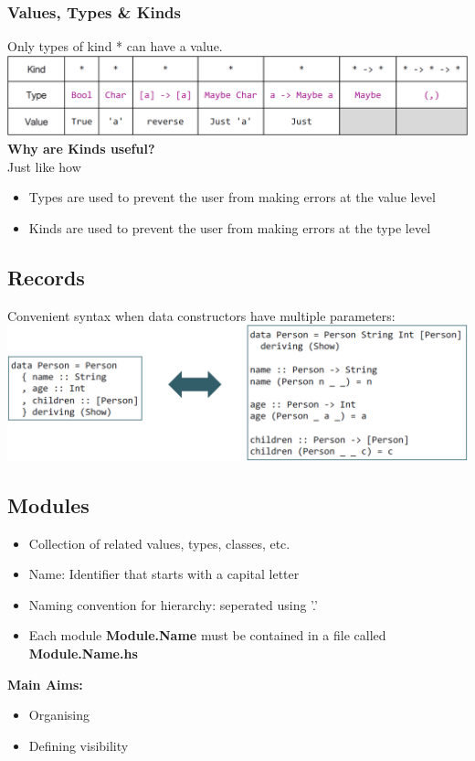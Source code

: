\subsubsection{Values, Types \& Kinds}
Only types of kind * can have a value.\\
\includegraphics[width=\linewidth]{img/values_types_kinds.png}
\textbf{Why are Kinds useful?}\\
Just like how
\begin{itemize}
    \item Types are used to prevent the user from making errors at the value level
    \item Kinds are used to prevent the user from making errors at the type level
\end{itemize}

\subsection{Records}
Convenient syntax when data constructors have multiple parameters:\\
\includegraphics[width=\linewidth]{img/records.png}

\subsection{Modules}
\begin{itemize}
    \item Collection of related values, types, classes, etc.
    \item Name: Identifier that starts with a capital letter
    \item Naming convention for hierarchy: seperated using '.'
    \item Each module \textbf{Module.Name} must be contained in a file called \textbf{Module.Name.hs}
\end{itemize}
\textbf{Main Aims:}
\begin{itemize}
    \item Organising
    \item Defining visibility
\end{itemize}